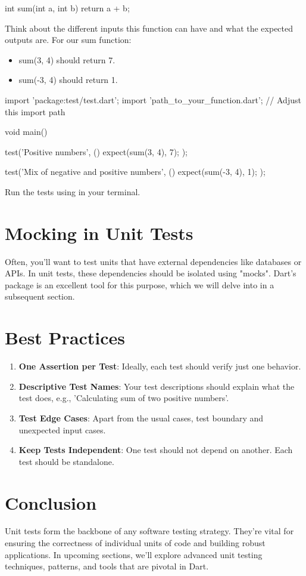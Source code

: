 \begin{dartcode}
int sum(int a, int b) {
  return a + b;
}
\end{dartcode}

Think about the different inputs this function can have and what the expected outputs are. 
For our sum function:
\begin{itemize}
 \item sum(3, 4) should return 7.
 \item sum(-3, 4) should return 1.
\end{itemize}

\begin{dartcode}
import 'package:test/test.dart';
import 'path_to_your_function.dart';  // Adjust this import path
 
void main() {
  test('Positive numbers', () {
    expect(sum(3, 4), 7);
  });
 
  test('Mix of negative and positive numbers', () {
    expect(sum(-3, 4), 1);
  });
}
\end{dartcode}
Run the tests using  in your terminal.

\section*{Mocking in Unit Tests}
Often, you'll want to test units that have external dependencies like databases or APIs. 
In unit tests, these dependencies should be isolated using "mocks". Dart's  package is an excellent tool for this purpose, which we will delve into in a subsequent section.

\section*{Best Practices}
\begin{enumerate}
 \item \textbf{One Assertion per Test}: Ideally, each test should verify just one behavior.
 \item \textbf{Descriptive Test Names}: Your test descriptions should explain what the test does, e.g., 'Calculating sum of two positive numbers'.
 \item \textbf{Test Edge Cases}: Apart from the usual cases, test boundary and unexpected input cases.
 \item \textbf{Keep Tests Independent}: One test should not depend on another. Each test should be standalone.
\end{enumerate}

\section*{Conclusion}
Unit tests form the backbone of any software testing strategy. 
They're vital for ensuring the correctness of individual units of code and building robust applications. 
In upcoming sections, we'll explore advanced unit testing techniques, patterns, and tools that are pivotal in Dart.